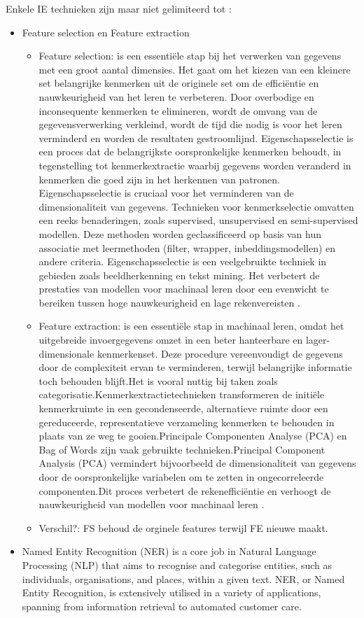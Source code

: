 Enkele IE technieken zijn maar niet gelimiteerd tot \autocite{IBM2024}:
\begin{itemize}
  \item Feature selection en Feature extraction
  \begin{itemize}
    \item Feature selection: is een essentiële stap bij het verwerken van gegevens met een groot aantal dimensies. Het gaat om het kiezen van een kleinere set belangrijke kenmerken uit de originele set om de efficiëntie en nauwkeurigheid van het leren te verbeteren. Door overbodige en inconsequente kenmerken te elimineren, wordt de omvang van de gegevensverwerking verkleind, wordt de tijd die nodig is voor het leren verminderd en worden de resultaten gestroomlijnd. Eigenschapsselectie is een proces dat de belangrijkste oorspronkelijke kenmerken behoudt, in tegenstelling tot kenmerkextractie waarbij gegevens worden veranderd in kenmerken die goed zijn in het herkennen van patronen. Eigenschapsselectie is cruciaal voor het verminderen van de dimensionaliteit van gegevens. Technieken voor kenmerkselectie omvatten een reeks benaderingen, zoals supervised, unsupervised en semi-supervised modellen. Deze methoden worden geclassificeerd op basis van hun associatie met leermethoden (filter, wrapper, inbeddingsmodellen) en andere criteria. Eigenschapsselectie is een veelgebruikte techniek in gebieden zoals beeldherkenning en tekst mining. Het verbetert de prestaties van modellen voor machinaal leren door een evenwicht te bereiken tussen hoge nauwkeurigheid en lage rekenvereisten \autocite{CAI201870}.
    \item Feature extraction: is een essentiële stap in machinaal leren, omdat het uitgebreide invoergegevens omzet in een beter hanteerbare en lager-dimensionale kenmerkenset. Deze procedure vereenvoudigt de gegevens door de complexiteit ervan te verminderen, terwijl belangrijke informatie toch behouden blijft.Het is vooral nuttig bij taken zoals categorisatie.Kenmerkextractietechnieken transformeren de initiële kenmerkruimte in een gecondenseerde, alternatieve ruimte door een gereduceerde, representatieve verzameling kenmerken te behouden in plaats van ze weg te gooien.Principale Componenten Analyse (PCA) en Bag of Words zijn vaak gebruikte technieken.Principal Component Analysis (PCA) vermindert bijvoorbeeld de dimensionaliteit van gegevens door de oorspronkelijke variabelen om te zetten in ongecorreleerde componenten.Dit proces verbetert de rekenefficiëntie en verhoogt de nauwkeurigheid van modellen voor machinaal leren \autocite{Mustazzihim}.
    \item Verschil?: FS behoud de orginele features terwijl FE nieuwe maakt.
  \end{itemize}
    \item Named Entity Recognition (NER) is a core job in Natural Language Processing (NLP) that aims to recognise and categorise entities, such as individuals, organisations, and places, within a given text. NER, or Named Entity Recognition, is extensively utilised in a variety of applications, spanning from information retrieval to automated customer care.


\end{itemize}
